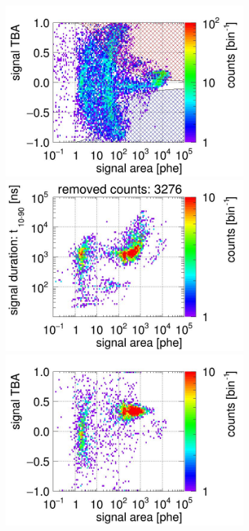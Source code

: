 \begin{landscape}
\begin{figure}[!p]
\begin{subfigure}[t]{0.32\textwidth}
			\includegraphics[width=\figurewidth,clip,trim={0 98 0 40}]{Figures/GasTest/CutsValid/res64766/tbapa26Vecfig64766.jpg}
			\includegraphics[width=\figurewidth,clip,trim={0 98 0 15}]{Figures/GasTest/CutsValid/res64766/pdpaX26Vecfig64766.jpg}
			\includegraphics[width=\figurewidth,clip,trim={0 8 0 40}]{Figures/GasTest/CutsValid/res64766/tbapaX26Vecfig64766.jpg}

\end{subfigure}
\end{figure}
\end{landscape}
